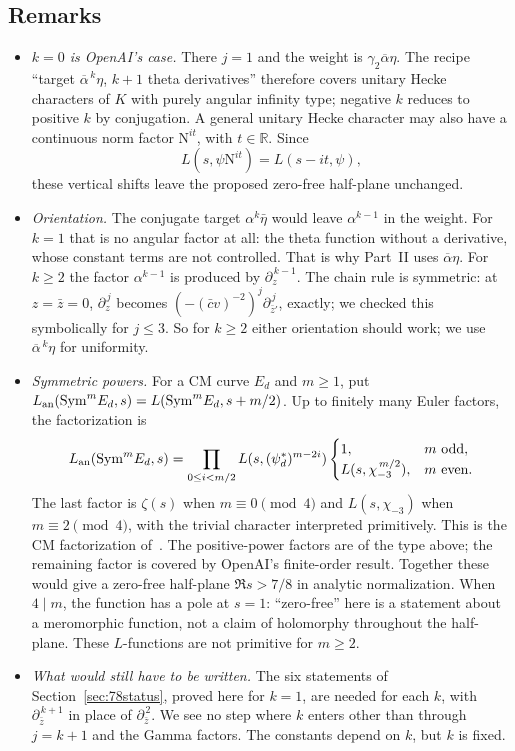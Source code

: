\documentclass[11pt]{article}
\numberwithin{equation}{section}
\newcommand{\N}{\mathrm N}
\begin{document}
\subsection{Remarks}
\begin{itemize}
\item \emph{$k=0$ is OpenAI's case.} There $j=1$ and the weight is $\gamma_2\overline\alpha\eta$. The recipe ``target
 $\overline\alpha^{\,k}\eta$, $k+1$ theta derivatives'' therefore covers unitary Hecke characters of $K$ with
 purely angular infinity type; negative $k$ reduces to positive $k$ by conjugation. A general unitary
 Hecke character may also have a continuous norm factor $\N^{it}$, with $t\in\mathbb R$. Since
 \begin{equation}\label{eq:d094}
  L(s,\psi\N^{it})=L(s-it,\psi),
 \end{equation}
 these vertical shifts leave the proposed zero-free half-plane unchanged.
\item \emph{Orientation.} The conjugate target $\alpha^k\bar\eta$ would leave $\alpha^{k-1}$ in the weight. For $k=1$
 that is no angular factor at all: the theta function without a derivative, whose constant terms are
 not controlled. That is why Part~II uses $\overline\alpha\eta$. For $k\ge2$ the factor $\alpha^{k-1}$ is produced by
 $\partial_z^{\,k-1}$. The chain rule is symmetric: at $z=\bar z=0$, $\partial_z^{\,j}$ becomes
 $(-(\bar cv)^{-2})^j\partial_{\bar z'}^{\,j}$, exactly; we checked this symbolically for $j\le3$. So for $k\ge2$
 either orientation should work; we use $\overline\alpha^{\,k}\eta$ for uniformity.
\item \emph{Symmetric powers.} For a CM curve $E_d$ and $m\ge1$, put
 $L_{\rm an}(\mathrm{Sym}^mE_d,s)=L(\mathrm{Sym}^mE_d,s+m/2)$.
 Up to finitely many Euler factors, the factorization is
 \begin{equation}\label{eq:d095}
  L_{\rm an}(\mathrm{Sym}^mE_d,s)
  =\prod_{0\le i<m/2}L(s,(\psi_d^*)^{m-2i})
   \begin{cases}
    1,&m\text{ odd},\\
    L(s,\chi_{-3}^{\,m/2}),&m\text{ even}.
   \end{cases}
 \end{equation}
 The last factor is $\zeta(s)$ when $m\equiv0\pmod4$ and $L(s,\chi_{-3})$ when
 $m\equiv2\pmod4$, with the trivial character interpreted primitively. This is the CM
 factorization of~\cite[\S3.5]{MW}. The positive-power factors are of the type above; the remaining
 factor is covered by OpenAI's finite-order result. Together these would give a zero-free
 half-plane $\Re s>7/8$ in analytic normalization. When $4\mid m$, the function has a pole at $s=1$:
 ``zero-free'' here is a statement about a meromorphic function, not a claim of holomorphy throughout
 the half-plane. These $L$-functions are not primitive for $m\ge2$.
\item \emph{What would still have to be written.} The six statements of Section~\ref{sec:78status}, proved here
 for $k=1$, are needed for each $k$, with $\partial_{\bar z}^{\,k+1}$ in place of $\partial_{\bar z}^{\,2}$. We see no step where $k$
 enters other than through $j=k+1$ and the Gamma factors. The constants depend on $k$, but $k$ is fixed.
\end{itemize}
\end{document}
